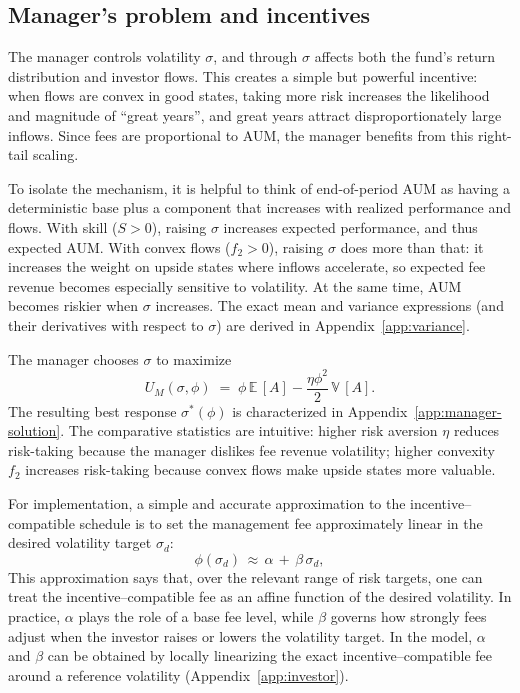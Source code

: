 \documentclass[11pt]{article}
\def\E{{\mathbb{E}}\,}
\def\V{{\mathbb{V}}\,}
\newcommand{\Sharpe}{S}
\begin{document}
\subsection{Manager’s problem and incentives}
\label{sec:manager}

The manager controls volatility $\sigma$, and through $\sigma$ affects both the fund’s return distribution and investor flows. This creates a simple but powerful incentive: when flows are convex in good states, taking more risk increases the likelihood and magnitude of “great years”, and great years attract disproportionately large inflows. Since fees are proportional to AUM, the manager benefits from this right-tail scaling.

To isolate the mechanism, it is helpful to think of end-of-period AUM as having a deterministic base plus a component that increases with realized performance and flows. With skill ($\Sharpe>0$), raising $\sigma$ increases expected performance, and thus expected AUM. With convex flows ($f_2>0$), raising $\sigma$ does more than that: it increases the weight on upside states where inflows accelerate, so expected fee revenue becomes especially sensitive to volatility. At the same time, AUM becomes riskier when $\sigma$ increases. The exact mean and variance expressions (and their derivatives with respect to $\sigma$) are derived in Appendix~\ref{app:variance}.

The manager chooses \(\sigma\) to maximize
\[
U_M(\sigma,\phi)\;=\;\phi\,\E[A] - \frac{\eta\phi^2}{2}\,\V[A].
\]
The resulting best response $\sigma^*(\phi)$ is characterized in Appendix~\ref{app:manager-solution}. The comparative statistics are intuitive: higher risk aversion $\eta$ reduces risk-taking because the manager dislikes fee revenue volatility; higher convexity $f_2$ increases risk-taking because convex flows make upside states more valuable.

For implementation, a simple and accurate approximation to the incentive–compatible schedule is to set the management fee approximately linear in the desired volatility target $\sigma_d$:
\begin{equation}
\label{eq:phi-linear-approx}
\phi(\sigma_d) \,\approx\, \alpha \, + \, \beta\,\sigma_d,
\end{equation}
This approximation says that, over the relevant range of risk targets, one can treat the incentive–compatible fee as an affine function of the desired volatility. In practice, $\alpha$ plays the role of a base fee level, while $\beta$ governs how strongly fees adjust when the investor raises or lowers the volatility target. In the model, $\alpha$ and $\beta$ can be obtained by locally linearizing the exact incentive–compatible fee around a reference volatility (Appendix~\ref{app:investor}).
\end{document}
